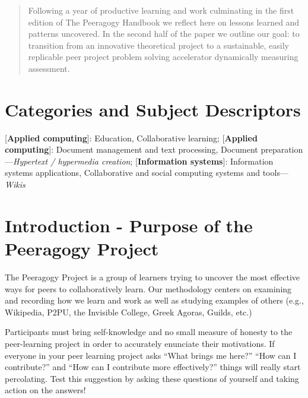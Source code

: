 \documentclass{acm_proc_article-sp}
\begin{document}

\maketitle
\begin{abstract}

Following a year of productive learning and work culminating in the first edition of The Peeragogy Handbook we reflect here on lessons learned and patterns uncovered. In the second half of the paper we outline our goal: to transition from an innovative theoretical project to a sustainable, easily replicable peer project problem solving accelerator dynamically measuring assessment.

\end{abstract}

%
%
%
%

\section*{Categories and Subject Descriptors}
[{\bf Applied computing}]: {Education}, {Collaborative learning};
[{\bf Applied computing}]: {Document management and text processing}, {Document preparation}---\emph{Hypertext / hypermedia creation};
[{\bf Information systems}]: {Information systems applications}, {Collaborative and social computing systems and tools}---\emph{Wikis}



%
%
%
%

\section{Introduction - Purpose of the Peeragogy Project}

The Peeragogy Project is a group of learners trying to uncover the most effective ways for peers to collaboratively learn. Our methodology centers on examining and recording how we learn and work as well as studying examples of others (e.g., Wikipedia, P2PU, the Invisible College, Greek Agoras, Guilds, etc.)

Participants must bring self-knowledge and no small measure of honesty to the peer-learning project in order to accurately enunciate their motivations. If everyone in your peer learning project asks ``What brings me here?'' ``How can I contribute?'' and ``How can I contribute more effectively?'' things will really start percolating. Test this suggestion by asking these questions of yourself and taking action on the answers!
\end{document}
